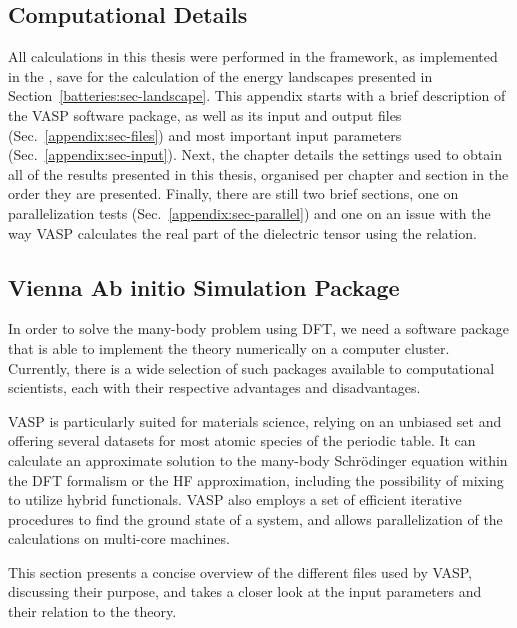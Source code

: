 \begin{refsection} 

\chapter{Computational Details} \label{appendix:sec-computational} 
\pagestyle{chapter}

All calculations in this thesis were performed in the  framework, 
as implemented in the , save for the calculation of the energy 
landscapes presented in Section~\ref{batteries:sec-landscape}. This appendix starts with 
a brief description of the \gls{VASP} software package, as well as its input and 
output files (Sec.~\ref{appendix:sec-files}) and most important input 
parameters (Sec.~\ref{appendix:sec-input}). Next, the chapter details the 
settings used to obtain all of the results presented in this thesis, organised 
per chapter and section in the order they are presented. Finally, there are 
still two brief sections, one on parallelization tests 
(Sec.~\ref{appendix:sec-parallel}) and one on an issue with the way 
\gls{VASP} calculates the real part of the dielectric tensor using 
the  relation.

\section{Vienna Ab initio Simulation Package} \label{appendix:sec-VASP} 
 
In order to solve the many-body problem using \gls{DFT}, we need a software package 
that is able to implement the theory numerically on a computer cluster. 
Currently, there is a wide selection of such packages available to 
computational scientists, each with their respective advantages and 
disadvantages. 
 
\gls{VASP} is particularly suited for materials science, relying on an unbiased
 set and offering several  datasets for 
most atomic species of the periodic table. It can calculate an approximate 
solution to the many-body Schr\"odinger equation within the \gls{DFT} formalism or 
the \gls{HF} approximation, including the possibility of mixing to utilize hybrid 
functionals. \gls{VASP} also employs a set of efficient iterative procedures to find 
the ground state of a system, and allows parallelization of the calculations 
on multi-core machines. 
 
This section presents a concise overview of the different files used by 
VASP, discussing their purpose, and takes a closer look at the 
input parameters and their relation to the theory. 
 

\end{refsection}
